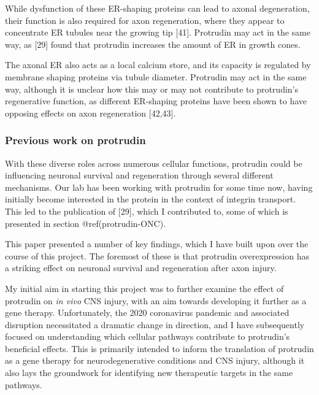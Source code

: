 \documentclass[
  12pt,
  a4paper,
]{article}
\begin{document}
While dysfunction of these ER-shaping proteins can lead to axonal
degeneration, their function is also required for axon regeneration,
where they appear to concentrate ER tubules near the growing tip
{[}41{]}. Protrudin may act in the same way, as {[}29{]} found that
protrudin increases the amount of ER in growth cones.

The axonal ER also acts as a local calcium store, and its capacity is
regulated by membrane shaping proteins via tubule diameter. Protrudin
may act in the same way, although it is unclear how this may or may not
contribute to protrudin's regenerative function, as different ER-shaping
proteins have been shown to have opposing effects on axon regeneration
{[}42,43{]}.

\hypertarget{previous-work-on-protrudin}{%
\subsubsection{Previous work on
protrudin}\label{previous-work-on-protrudin}}

With these diverse roles across numerous cellular functions, protrudin
could be influencing neuronal survival and regeneration through several
different mechanisms. Our lab has been working with protrudin for some
time now, having initially become interested in the protein in the
context of integrin transport. This led to the publication of {[}29{]},
which I contributed to, some of which is presented in section
@ref(protrudin-ONC).

This paper presented a number of key findings, which I have built upon
over the course of this project. The foremost of these is that protrudin
overexpression has a striking effect on neuronal survival and
regeneration after axon injury.

My initial aim in starting this project was to further examine the
effect of protrudin on \emph{in vivo} CNS injury, with an aim towards
developing it further as a gene therapy. Unfortunately, the 2020
coronavirus pandemic and associated disruption necessitated a dramatic
change in direction, and I have subsequently focused on understanding
which cellular pathways contribute to protrudin's beneficial effects.
This is primarily intended to inform the translation of protrudin as a
gene therapy for neurodegenerative conditions and CNS injury, although
it also lays the groundwork for identifying new therapeutic targets in
the same pathways.
\end{document}
